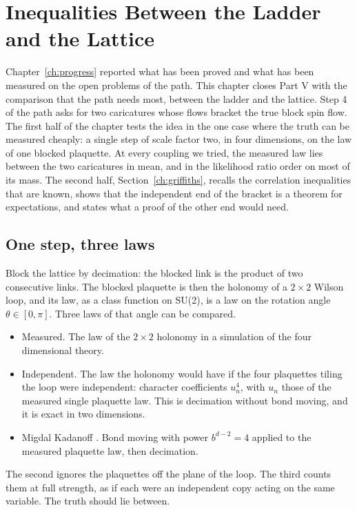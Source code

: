 \chapter{Inequalities Between the Ladder and the Lattice}\label{ch:sandwich}

Chapter~\ref{ch:progress} reported what has been proved and what has been measured on the open problems of the path. This chapter closes Part V with the comparison that the path needs most, between the ladder and the lattice. Step 4 of the path asks for two caricatures whose flows bracket the true block spin flow. The first half of the chapter tests the idea in the one case where the truth can be measured cheaply: a single step of scale factor two, in four dimensions, on the law of one blocked plaquette. At every coupling we tried, the measured law lies between the two caricatures in mean, and in the likelihood ratio order on most of its mass. The second half, Section~\ref{ch:griffiths}, recalls the correlation inequalities that are known, shows that the independent end of the bracket is a theorem for expectations, and states what a proof of the other end would need.

\section{One step, three laws}

Block the lattice by decimation: the blocked link is the product of two consecutive links. The blocked plaquette is then the holonomy of a $2\times2$ Wilson loop, and its law, as a class function on SU(2), is a law on the rotation angle $\theta\in[0,\pi]$. Three laws of that angle can be compared.
\begin{itemize}
\item Measured. The law of the $2\times2$ holonomy in a simulation of the four dimensional theory.
\item Independent. The law the holonomy would have if the four plaquettes tiling the loop were independent: character coefficients $u_n^4$, with $u_n$ those of the measured single plaquette law. This is decimation without bond moving, and it is exact in two dimensions.
\item Migdal Kadanoff \cite{Mi75,Ka76}. Bond moving with power $b^{d-2}=4$ applied to the measured plaquette law, then decimation.
\end{itemize}
The second ignores the plaquettes off the plane of the loop. The third counts them at full strength, as if each were an independent copy acting on the same variable. The truth should lie between.

